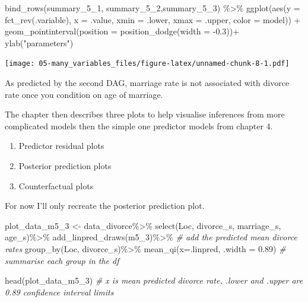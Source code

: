 \documentclass[
]{book}
\newenvironment{Shaded}{\begin{snugshade}}{\end{snugshade}}
\newcommand{\AttributeTok}[1]{\textcolor[rgb]{0.77,0.63,0.00}{#1}}
\newcommand{\CommentTok}[1]{\textcolor[rgb]{0.56,0.35,0.01}{\textit{#1}}}
\newcommand{\FloatTok}[1]{\textcolor[rgb]{0.00,0.00,0.81}{#1}}
\newcommand{\FunctionTok}[1]{\textcolor[rgb]{0.00,0.00,0.00}{#1}}
\newcommand{\NormalTok}[1]{#1}
\newcommand{\OtherTok}[1]{\textcolor[rgb]{0.56,0.35,0.01}{#1}}
\newcommand{\SpecialCharTok}[1]{\textcolor[rgb]{0.00,0.00,0.00}{#1}}
\newcommand{\StringTok}[1]{\textcolor[rgb]{0.31,0.60,0.02}{#1}}
\providecommand{\tightlist}{%
  \setlength{\itemsep}{0pt}\setlength{\parskip}{0pt}}
\begin{document}
\begin{Shaded}
\begin{Highlighting}[]
\FunctionTok{bind\_rows}\NormalTok{(summary\_5\_1, summary\_5\_2,summary\_5\_3) }\SpecialCharTok{\%\textgreater{}\%}
  \FunctionTok{ggplot}\NormalTok{(}\FunctionTok{aes}\NormalTok{(}\AttributeTok{y =} \FunctionTok{fct\_rev}\NormalTok{(.variable), }\AttributeTok{x =}\NormalTok{ .value, }\AttributeTok{xmin =}\NormalTok{ .lower, }\AttributeTok{xmax =}\NormalTok{ .upper, }\AttributeTok{color =}\NormalTok{ model)) }\SpecialCharTok{+}
  \FunctionTok{geom\_pointinterval}\NormalTok{(}\AttributeTok{position =} \FunctionTok{position\_dodge}\NormalTok{(}\AttributeTok{width =} \SpecialCharTok{{-}}\FloatTok{0.3}\NormalTok{))}\SpecialCharTok{+}
  \FunctionTok{ylab}\NormalTok{(}\StringTok{"parameters"}\NormalTok{)}
\end{Highlighting}
\end{Shaded}

\texttt{[image: 05-many\_variables\_files/figure-latex/unnamed-chunk-8-1.pdf]}

As predicted by the second DAG, marriage rate is not associated with divorce rate once you condition on age of marriage.

The chapter then describes three plots to help visualise inferences from more complicated models then the simple one predictor models from chapter 4.

\begin{enumerate}
\def\labelenumi{(\arabic{enumi})}
\tightlist
\item
  Predictor residual plots
\item
  Posterior prediction plots
\item
  Counterfactual plots
\end{enumerate}

For now I'll only recreate the posterior prediction plot.

\begin{Shaded}
\begin{Highlighting}[]
\NormalTok{plot\_data\_m5\_3 }\OtherTok{\textless{}{-}}\NormalTok{ data\_divorce}\SpecialCharTok{\%\textgreater{}\%}
  \FunctionTok{select}\NormalTok{(Loc, divorce\_s, marriage\_s, age\_s)}\SpecialCharTok{\%\textgreater{}\%}
  \FunctionTok{add\_linpred\_draws}\NormalTok{(m5\_3)}\SpecialCharTok{\%\textgreater{}\%} \CommentTok{\# add the predicted mean divorce rates}
  \FunctionTok{group\_by}\NormalTok{(Loc, divorce\_s)}\SpecialCharTok{\%\textgreater{}\%}
  \FunctionTok{mean\_qi}\NormalTok{(}\AttributeTok{x=}\NormalTok{.linpred, }\AttributeTok{.width =} \FloatTok{0.89}\NormalTok{) }\CommentTok{\# summarise each group in the df }

\FunctionTok{head}\NormalTok{(plot\_data\_m5\_3) }\CommentTok{\# x is mean predicted divorce rate, .lower and .upper are 0.89 confidence interval limits}
\end{Highlighting}
\end{Shaded}
\end{document}
